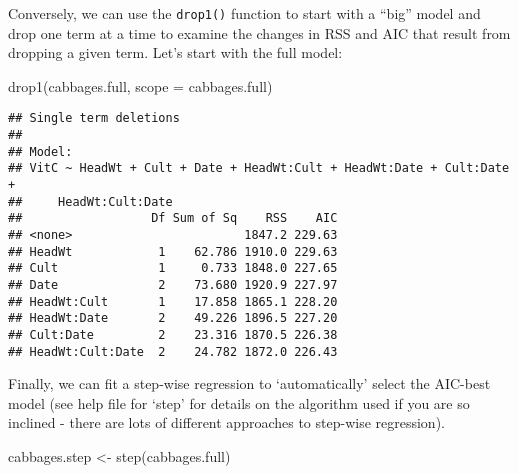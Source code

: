 \documentclass[
]{article}
\newenvironment{Shaded}{\begin{snugshade}}{\end{snugshade}}
\newcommand{\AttributeTok}[1]{\textcolor[rgb]{0.77,0.63,0.00}{#1}}
\newcommand{\FunctionTok}[1]{\textcolor[rgb]{0.00,0.00,0.00}{#1}}
\newcommand{\NormalTok}[1]{#1}
\newcommand{\OtherTok}[1]{\textcolor[rgb]{0.56,0.35,0.01}{#1}}
\begin{document}
Conversely, we can use the \texttt{drop1()} function to start with a
``big'' model and drop one term at a time to examine the changes in RSS
and AIC that result from dropping a given term. Let's start with the
full model:

\begin{Shaded}
\begin{Highlighting}[]
\FunctionTok{drop1}\NormalTok{(cabbages.full, }\AttributeTok{scope =}\NormalTok{ cabbages.full)}
\end{Highlighting}
\end{Shaded}

\begin{verbatim}
## Single term deletions
## 
## Model:
## VitC ~ HeadWt + Cult + Date + HeadWt:Cult + HeadWt:Date + Cult:Date + 
##     HeadWt:Cult:Date
##                  Df Sum of Sq    RSS    AIC
## <none>                        1847.2 229.63
## HeadWt            1    62.786 1910.0 229.63
## Cult              1     0.733 1848.0 227.65
## Date              2    73.680 1920.9 227.97
## HeadWt:Cult       1    17.858 1865.1 228.20
## HeadWt:Date       2    49.226 1896.5 227.20
## Cult:Date         2    23.316 1870.5 226.38
## HeadWt:Cult:Date  2    24.782 1872.0 226.43
\end{verbatim}

Finally, we can fit a step-wise regression to `automatically' select the
AIC-best model (see help file for `step' for details on the algorithm
used if you are so inclined - there are lots of different approaches to
step-wise regression).

\begin{Shaded}
\begin{Highlighting}[]
\NormalTok{cabbages.step }\OtherTok{\textless{}{-}} \FunctionTok{step}\NormalTok{(cabbages.full)}
\end{Highlighting}
\end{Shaded}
\end{document}
